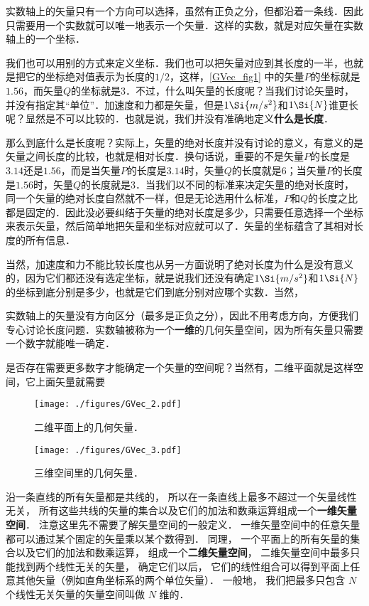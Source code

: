 实数轴上的矢量只有一个方向可以选择，虽然有正负之分，但都沿着一条线．因此只需要用一个实数就可以唯一地表示一个矢量．这样的实数，就是对应矢量在实数轴上的一个坐标．

我们也可以用别的方式来定义坐标．我们也可以把矢量对应到其长度的一半，也就是把它的坐标绝对值表示为长度的$1/2$，这样，\autoref{GVec_fig1} 中的矢量$P$的坐标就是$1.56$，而矢量$Q$的坐标就是$3$．不过，什么叫矢量的长度呢？当我们讨论矢量时，并没有指定其“单位”．加速度和力都是矢量，但是$1\Si{m/s^2}$和$1\Si{N}$谁更长呢？显然是不可以比较的．也就是说，我们并没有准确地定义\textbf{什么是长度}．

那么到底什么是长度呢？实际上，矢量的绝对长度并没有讨论的意义，有意义的是矢量之间长度的比较，也就是相对长度．换句话说，重要的不是矢量$P$的长度是$3.14$还是$1.56$，而是当矢量$P$的长度是$3.14$时，矢量$Q$的长度就是$6$；当矢量$P$的长度是$1.56$时，矢量$Q$的长度就是$3$．当我们以不同的标准来决定矢量的绝对长度时，同一个矢量的绝对长度自然就不一样，但是无论选用什么标准，$P$和$Q$的长度之比都是固定的．因此没必要纠结于矢量的绝对长度是多少，只需要任意选择一个坐标来表示矢量，然后简单地把矢量和坐标对应就可以了．矢量的坐标蕴含了其相对长度的所有信息．

当然，加速度和力不能比较长度也从另一方面说明了绝对长度为什么是没有意义的，因为它们都还没有选定坐标，就是说我们还没有确定$1\Si{m/s^2}$和$1\Si{N}$的坐标到底分别是多少，也就是它们到底分别对应哪个实数．当然，

实数轴上的矢量没有方向区分（最多是正负之分），因此不用考虑方向，方便我们专心讨论长度问题．实数轴被称为一个\textbf{一维}的几何矢量空间，因为所有矢量只需要一个数字就能唯一确定．

是否存在需要更多数字才能确定一个矢量的空间呢？当然有，二维平面就是这样空间，它上面矢量就需要

\begin{figure}[ht]
\centering
\texttt{[image: ./figures/GVec\_2.pdf]}
\caption{二维平面上的几何矢量．} \label{GVec_fig2}
\end{figure}

\begin{figure}[ht]
\centering
\texttt{[image: ./figures/GVec\_3.pdf]}
\caption{三维空间里的几何矢量．} \label{GVec_fig3}
\end{figure}

沿一条直线的所有矢量都是共线的， 所以在一条直线上最多不超过一个矢量线性无关， 所有这些共线的矢量的集合以及它们的加法和数乘运算组成一个\textbf{一维矢量空间}． 注意这里先不需要了解矢量空间的一般定义． 一维矢量空间中的任意矢量都可以通过某个固定的矢量乘以某个数得到． 同理， 一个平面上的所有矢量的集合以及它们的加法和数乘运算， 组成一个\textbf{二维矢量空间}， 二维矢量空间中最多只能找到两个线性无关的矢量， 确定它们以后， 它们的线性组合可以得到平面上任意其他矢量（例如直角坐标系的两个单位矢量）． 一般地， 我们把最多只包含 $N$ 个线性无关矢量的矢量空间叫做 $N$ 维的．

